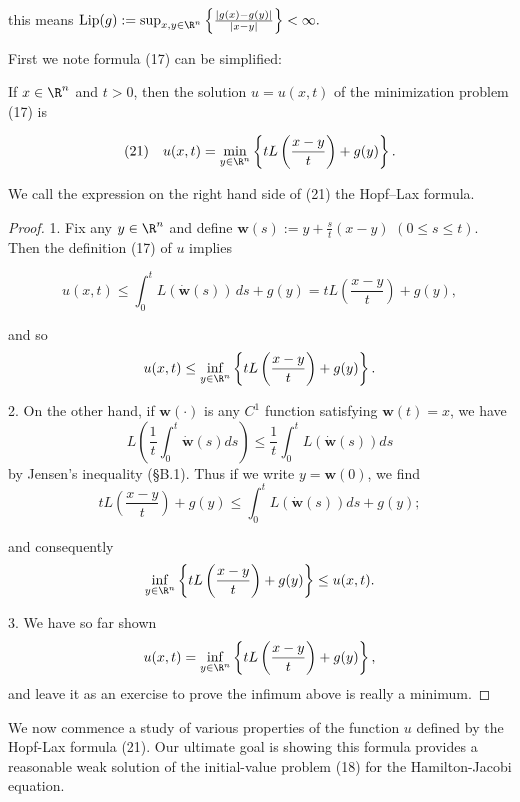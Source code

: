this means $\text{Lip}(g) := \sup_{x,y \in \R^n} \left\{ \frac{|g(x) - g(y)|}{|x - y|} \right\} < \infty.$

First we note formula (17) can be simplified:

\begin{theorem}
\label{thm:hopf-lax-formula-derivation}
If $x \in \R^n$ and $t > 0$, then the solution $u = u(x,t)$ of the minimization problem (17) is

$$(21) \quad u(x,t) = \min_{y \in \R^n} \left\{ tL \left( \frac{x-y}{t} \right) + g(y) \right\}.$$
\end{theorem}

\begin{definition}
\label{def:hopf-lax-formula}
We call the expression on the right hand side of (21) the Hopf--Lax formula.
\end{definition}

\begin{proof}
1. Fix any $y \in \R^n$ and define $\mathbf{w}(s) := y + \frac{s}{t}(x-y)$ $(0 \leq s \leq t)$. Then the definition (17) of $u$ implies

$$u(x,t) \leq \int_0^t L(\dot{\mathbf{w}}(s)) \, ds + g(y) = tL \left( \frac{x-y}{t} \right) + g(y),$$

and so
$$u(x,t) \le \inf_{y \in \R^n} \left\{ tL\left(\frac{x-y}{t}\right) + g(y) \right\}.$$

2. On the other hand, if $\mathbf{w}(\cdot)$ is any $C^1$ function satisfying $\mathbf{w}(t) = x$, we have
$$L\left(\frac{1}{t}\int_0^t \dot{\mathbf{w}}(s) ds\right) \le \frac{1}{t}\int_0^t L(\dot{\mathbf{w}}(s)) ds$$
by Jensen's inequality (\S B.1). Thus if we write $y = \mathbf{w}(0)$, we find
$$tL\left(\frac{x-y}{t}\right) + g(y) \le \int_0^t L(\dot{\mathbf{w}}(s)) ds + g(y);$$

and consequently
$$\inf_{y \in \R^n} \left\{ tL\left(\frac{x-y}{t}\right) + g(y) \right\} \le u(x,t).$$

3. We have so far shown
$$u(x,t) = \inf_{y \in \R^n} \left\{ tL\left(\frac{x-y}{t}\right) + g(y) \right\},$$
and leave it as an exercise to prove the infimum above is really a minimum.
\end{proof}

We now commence a study of various properties of the function $u$ defined by the Hopf-Lax formula (21). Our ultimate goal is showing this formula provides a reasonable weak solution of the initial-value problem (18) for the Hamilton-Jacobi equation.

